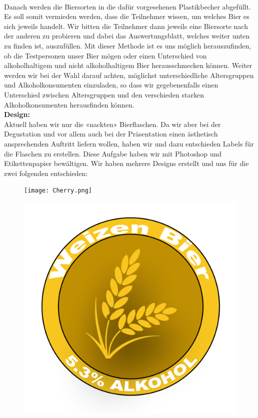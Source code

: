 \paragraph{}
Danach werden die Biersorten in die dafür vorgesehenen Plastikbecher abgefüllt. Es soll somit vermieden werden, dass die Teilnehmer wissen, um welches Bier es sich jeweils handelt.
Wir bitten die Teilnehmer dann jeweils eine Biersorte nach der anderen zu probieren und dabei das Auswertungsblatt, welches weiter unten zu finden ist, auszufüllen. Mit dieser Methode ist es uns möglich herauszufinden, ob die Testpersonen unser Bier mögen oder einen Unterschied von alkoholhaltigem und nicht alkoholhaltigem Bier herausschmecken können. Weiter werden wir bei der Wahl darauf achten, möglichst unterschiedliche Altersgruppen und Alkoholkonsumenten einzuladen, so dass wir gegebenenfalls einen Unterschied zwischen Altersgruppen und den verschieden starken Alkoholkonsumenten herausfinden können.
\\
\textbf{Design:}\\
Aktuell haben wir nur die «nackten» Bierflaschen. Da wir aber bei der Degustation und vor allem auch bei der Präsentation einen ästhetisch ansprechenden Auftritt liefern wollen, haben wir und dazu entschieden Labels für die Flaschen zu erstellen. Diese Aufgabe haben wir mit Photoshop und Etikettenpapier bewältigen. Wir haben mehrere Designs erstellt und uns für die zwei folgenden entschieden:

\begin{figure}[!h]
    \centering
    \begin{minipage}{.5\textwidth}
      \centering
      \texttt{[image: Cherry.png]}
      \label{fig:test1}
    \end{minipage}%
    \begin{minipage}{.5\textwidth}
      \centering
      \includegraphics[width=.7\linewidth]{Figures/Wheat.png}
      \label{fig:test2}
    \end{minipage}
\end{figure}

